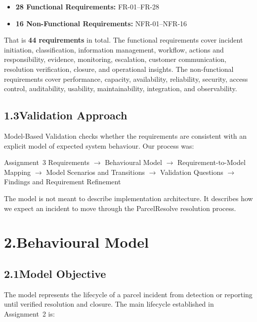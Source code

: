 \documentclass[11pt,a4paper]{article}
\begin{document}
\begin{itemize}
  \item \textbf{28 Functional Requirements:} FR-01–FR-28
  \item \textbf{16 Non-Functional Requirements:} NFR-01–NFR-16
\end{itemize}

That is \textbf{44 requirements} in total. The functional requirements cover incident initiation, classification, information management, workflow, actions and responsibility, evidence, monitoring, escalation, customer communication, resolution verification, closure, and operational insights. The non-functional requirements cover performance, capacity, availability, reliability, security, access control, auditability, usability, maintainability, integration, and observability.

\subsection*{1.3\enspace Validation Approach}

Model-Based Validation checks whether the requirements are consistent with an explicit model of expected system behaviour. Our process was:

\begin{center}
\small
Assignment~3 Requirements $\rightarrow$ Behavioural Model $\rightarrow$ Requirement-to-Model Mapping $\rightarrow$ Model Scenarios and Transitions $\rightarrow$ Validation Questions $\rightarrow$ Findings and Requirement Refinement
\end{center}

The model is not meant to describe implementation architecture. It describes how we expect an incident to move through the ParcelResolve resolution process.

\section*{2.\enspace Behavioural Model}

\subsection*{2.1\enspace Model Objective}

The model represents the lifecycle of a parcel incident from detection or reporting until verified resolution and closure. The main lifecycle established in Assignment~2 is:
\end{document}
